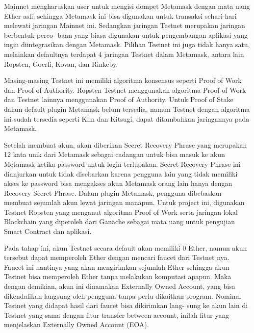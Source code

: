 Mainnet mengharuskan user untuk mengisi dompet Metamask dengan mata uang Ether asli, sehingga Metamask ini bisa digunakan untuk transaksi sehari-hari melewati jaringan Mainnet ini.
Sedangkan jaringan Testnet merupakan jaringan berbentuk perco- baan yang biasa digunakan untuk pengembangan aplikasi yang ingin diintegrasikan dengan Metamask. Pilihan Testnet ini juga tidak hanya satu, melainkan defaultnya terdapat
4 jaringan Testnet dalam Metamask, antara lain Ropsten, Goerli, Kovan, dan Rinkeby.

Masing-masing Testnet ini memiliki algoritma konsensus seperti Proof of Work dan Proof of Authority. Ropsten Testnet menggunakan algoritma Proof of Work dan Testnet lainnya menggunakan Proof of Authority. Untuk Proof of Stake dalam default plugin Metamask belum tersedia, namun Testnet dengan algoritma ini sudah tersedia seperti Kiln dan Kitsugi, dapat ditambahkan jaringannya pada Metamask.

Setelah membuat akun, akan diberikan Secret Recovery Phrase yang merupakan 12 kata unik dari Metamask sebagai cadangan untuk bisa masuk ke akun Metamask ketika password untuk login terlupakan. Secret Recovery Phrase ini dianjurkan untuk tidak disebarkan karena pengguna lain yang tidak memiliki akses ke password bisa mengakses akun Metamask orang lain hanya dengan Recovery Secret Phrase. Dalam plugin Metamask, pengguna dibebaskan membuat sejumlah akun lewat jaringan manapun. Untuk project ini, digunakan Testnet Ropsten yang menganut algoritma Proof of Work serta jaringan lokal Blockchain yang diperoleh dari Ganache sebagai mata uang untuk pengujian Smart Contract dan aplikasi.

Pada tahap ini, akun Testnet secara default akan memiliki 0 Ether, namun akun tersebut dapat memperoleh Ether dengan mencari faucet dari Testnet nya. Faucet ini nantinya yang akan mengirimkan sejumlah Ether sehingga akun Testnet bisa memperoleh Ether tanpa melakukan komputasi apapun. Maka dengan demikian, akun ini dinamakan Externally Owned Account, yang bisa dikendalikan langsung oleh pengguna tanpa perlu dikaitkan program. Nominal Testnet yang didapat hasil dari faucet bisa dikirimkan lang- sung ke akun lain di Testnet yang sama dengan fitur transfer between account, inilah fitur yang menjelaskan Externally Owned Account (EOA).

